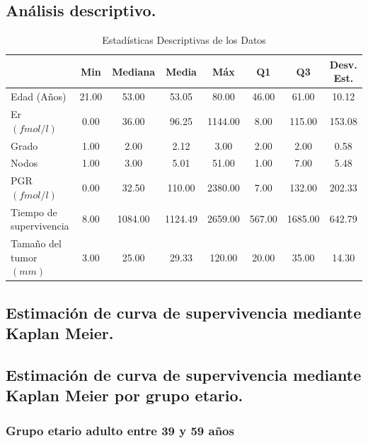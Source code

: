 \documentclass[10pt,a4paper]{article}
\begin{document}
\subsection{Análisis descriptivo.}

\begin{table}[htbp]
  \centering
  \caption{Estadísticas Descriptivas de los Datos}
  \begin{adjustbox}{width=\textwidth} %
    \begin{tabular}{lccccccc}
      \toprule
      & Min & Mediana & Media & Máx & Q1 & Q3 & Desv. Est. \\
      \midrule
      Edad (Años) & 21.00 & 53.00 & 53.05 & 80.00 & 46.00 & 61.00 & 10.12 \\
      Er $(fmol/l)$ & 0.00 & 36.00 & 96.25 & 1144.00 & 8.00 & 115.00 & 153.08 \\
      Grado & 1.00 & 2.00 & 2.12 & 3.00 & 2.00 & 2.00 & 0.58 \\
      
      Nodos & 1.00 & 3.00 & 5.01 & 51.00 & 1.00 & 7.00 & 5.48 \\
      PGR $(fmol/l)$ & 0.00 & 32.50 & 110.00 & 2380.00 & 7.00 & 132.00 & 202.33 \\
      
      Tiempo de supervivencia  & 8.00 & 1084.00 & 1124.49 & 2659.00 & 567.00 & 1685.00 & 642.79 \\
      Tamaño del tumor $(mm)$ & 3.00 & 25.00 & 29.33 & 120.00 & 20.00 & 35.00 & 14.30 \\
      
      \bottomrule
    \end{tabular}
  \end{adjustbox}
\end{table}


\subsection{Estimación de curva de supervivencia mediante Kaplan Meier.}

\subsection{Estimación de curva de supervivencia mediante Kaplan Meier por grupo etario.}
\subsubsection{Grupo etario adulto entre 39 y 59 años }
\end{document}
